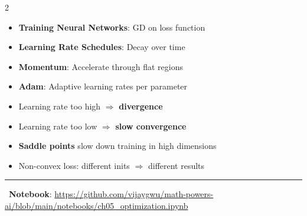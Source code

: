 \documentclass[11pt,letterpaper]{article}
\begin{document}
\begin{multicols}{2}
\begin{center}
\end{center}

\begin{tcolorbox}[appbox, title={\faRobot\ ML Applications}]
\begin{itemize}
    \item \textbf{Training Neural Networks}: GD on loss function
    \item \textbf{Learning Rate Schedules}: Decay over time
    \item \textbf{Momentum}: Accelerate through flat regions
    \item \textbf{Adam}: Adaptive learning rates per parameter
\end{itemize}
\end{tcolorbox}

\begin{tcolorbox}[warningbox, title={\faExclamationTriangle\ Common Pitfalls}]
\begin{itemize}
    \item Learning rate too high $\Rightarrow$ \textbf{divergence}
    \item Learning rate too low $\Rightarrow$ \textbf{slow convergence}
    \item \textbf{Saddle points} slow down training in high dimensions
    \item Non-convex loss: different inits $\Rightarrow$ different results
\end{itemize}
\end{tcolorbox}

\end{multicols}

\vspace{5pt}
\hrule
\vspace{5pt}

\begin{center}
\faGithub\ \textbf{Notebook}: \url{https://github.com/vijaygwu/math-powers-ai/blob/main/notebooks/ch05_optimization.ipynb}
\end{center}
\end{document}

